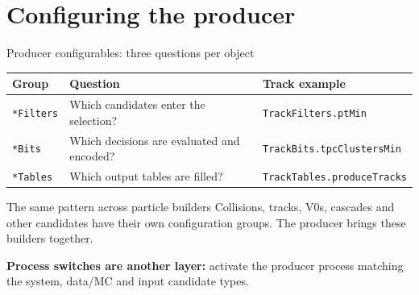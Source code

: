 \section{Configuring the producer}

\begin{frame}[shrink=8]{Producer configurables: three questions per object}
 \small
 \renewcommand{\arraystretch}{1.2}
 \begin{tabular}{p{}p{}p{}}
 \toprule
 Group & Question & Track example\\
 \midrule
 \texttt{*Filters} & Which candidates enter the selection? & \texttt{TrackFilters.ptMin}\\
 \texttt{*Bits} & Which decisions are evaluated and encoded? & \texttt{TrackBits.tpcClustersMin}\\
 \texttt{*Tables} & Which output tables are filled? & \texttt{TrackTables.produceTracks}\\
 \bottomrule
 \end{tabular}
 \medskip
 \begin{block}{The same pattern across particle builders}
 Collisions, tracks, V0s, cascades and other candidates have their own configuration groups. The producer brings these builders together.
 \end{block}
 \textbf{Process switches are another layer:} activate the producer process matching the system, data/MC and input candidate types.
\end{frame}

